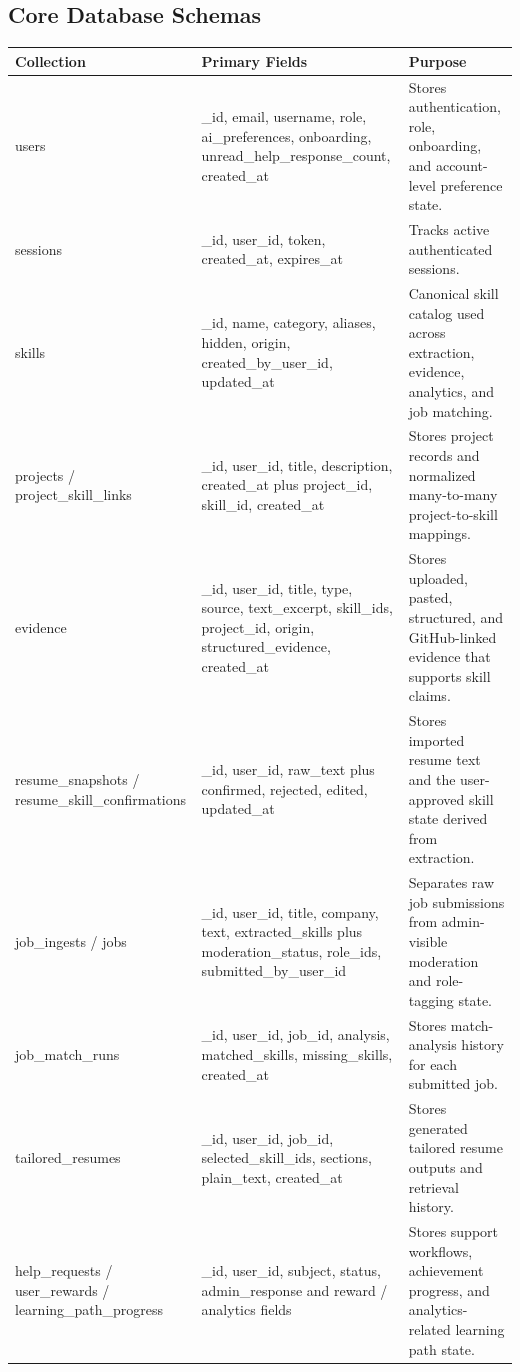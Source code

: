 \documentclass[11pt]{article}
\begin{document}
\subsection*{Core Database Schemas}
\begin{table}[H]
  \renewcommand{\arraystretch}{1.2}
  \begin{tabularx}{\linewidth}{@{}p{1.65in}Y Y@{}}
    \toprule
    \textbf{Collection} & \textbf{Primary Fields} & \textbf{Purpose} \\
    \midrule
    users & \_id, email, username, role, ai\_preferences, onboarding, unread\_help\_response\_count, created\_at & Stores authentication, role, onboarding, and account-level preference state. \\
    sessions & \_id, user\_id, token, created\_at, expires\_at & Tracks active authenticated sessions. \\
    skills & \_id, name, category, aliases, hidden, origin, created\_by\_user\_id, updated\_at & Canonical skill catalog used across extraction, evidence, analytics, and job matching. \\
    projects / project\_skill\_links & \_id, user\_id, title, description, created\_at plus project\_id, skill\_id, created\_at & Stores project records and normalized many-to-many project-to-skill mappings. \\
    evidence & \_id, user\_id, title, type, source, text\_excerpt, skill\_ids, project\_id, origin, structured\_evidence, created\_at & Stores uploaded, pasted, structured, and GitHub-linked evidence that supports skill claims. \\
    resume\_snapshots / resume\_skill\_confirmations & \_id, user\_id, raw\_text plus confirmed, rejected, edited, updated\_at & Stores imported resume text and the user-approved skill state derived from extraction. \\
    job\_ingests / jobs & \_id, user\_id, title, company, text, extracted\_skills plus moderation\_status, role\_ids, submitted\_by\_user\_id & Separates raw job submissions from admin-visible moderation and role-tagging state. \\
    job\_match\_runs & \_id, user\_id, job\_id, analysis, matched\_skills, missing\_skills, created\_at & Stores match-analysis history for each submitted job. \\
    tailored\_resumes & \_id, user\_id, job\_id, selected\_skill\_ids, sections, plain\_text, created\_at & Stores generated tailored resume outputs and retrieval history. \\
    help\_requests / user\_rewards / learning\_path\_progress & \_id, user\_id, subject, status, admin\_response and reward / analytics fields & Stores support workflows, achievement progress, and analytics-related learning path state. \\
    \bottomrule
  \end{tabularx}
\end{table}
\end{document}
